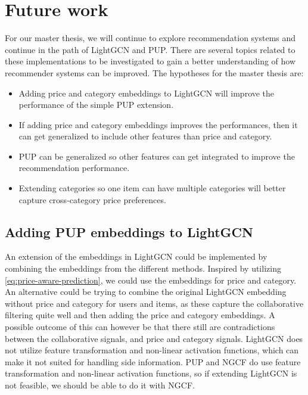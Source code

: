 \section{Future work}
For our master thesis, we will continue to explore recommendation systems and continue in the path of LightGCN and PUP.
There are several topics related to these implementations to be investigated to gain a better understanding of how recommender systems can be improved.
The hypotheses for the master thesis are:
\begin{itemize}
    \item Adding price and category embeddings to LightGCN will improve the performance of the simple PUP extension.
    \item If adding price and category embeddings improves the performances, then it can get generalized to include other features than price and category.
    \item PUP can be generalized so other features can get integrated to improve the recommendation performance.
    \item Extending categories so one item can have multiple categories will better capture cross-category price preferences.
\end{itemize}

\subsection{Adding PUP embeddings to LightGCN}
An extension of the embeddings in LightGCN could be implemented by combining the embeddings from the different methods.
Inspired by utilizing \autoref{eq:price-aware-prediction}, we could use the embeddings for price and category.
An alternative could be trying to combine the original LightGCN embedding without price and category for users and items, as these capture the collaborative filtering quite well and then adding the price and category embeddings.
A possible outcome of this can however be that there still are contradictions between the collaborative signals, and price and category signals.
LightGCN does not utilize feature transformation and non-linear activation functions, which can make it not suited for handling side information.
PUP and NGCF do use feature transformation and non-linear activation functions, so if extending LightGCN is not feasible, we should be able to do it with NGCF.

